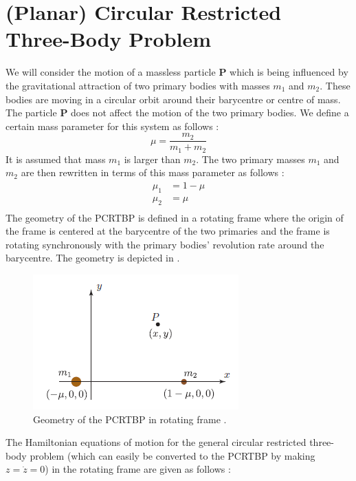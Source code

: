 \section{(Planar) Circular Restricted Three-Body Problem}
We will consider the motion of a massless particle \textbf{P} which is being influenced by the gravitational attraction of two primary bodies with masses $m_1$ and $m_2$. These bodies are moving in a circular orbit around their barycentre or centre of mass. The particle \textbf{P} does not affect the motion of the two primary bodies. We define a certain mass parameter for this system as follows \cite{invariant}:
\begin{equation}
\label{massparam}
\mu = \frac{m_2}{m_1 + m_2}
\end{equation}
%
It is assumed that mass $m_1$ is larger than $m_2$. The two primary masses $m_1$ and $m_2$ are then rewritten in terms of this mass parameter as follows \cite{invariant}:
\begin{equation}
\begin{aligned}
\mu_1 &= 1 - \mu \\
\mu_2 &= \mu \\
\end{aligned}
\end{equation}
%
The geometry of the \gls{PCRTBP} is defined in a rotating frame where the origin of the frame is centered at the barycentre of the two primaries and the frame is rotating synchronously with the primary bodies' revolution rate around the barycentre. The geometry is depicted in  \cite{invariant}.
%
\begin{figure}[h]
\centering
\captionsetup{justification=centering}
\includegraphics[scale=1]{rotframe.png}
\caption{Geometry of the \gls{PCRTBP} in rotating frame \cite{invariant}.}
\label{fig:rotframe}
\end{figure}
\FloatBarrier
%
The Hamiltonian equations of motion for the general circular restricted three-body problem (which can easily be converted to the \gls{PCRTBP} by making $z=\dot{z}=0$) in the rotating frame are given as follows \cite{invariant}:
